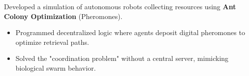 Developed a simulation of autonomous robots collecting resources using \textbf{Ant Colony Optimization} (Pheromones).
\begin{itemize}
\item Programmed decentralized logic where agents deposit digital pheromones to optimize retrieval paths.
\item Solved the "coordination problem" without a central server, mimicking biological swarm behavior.
\end{itemize}
{\LaTeXraggedright
{}
\par}